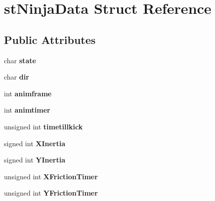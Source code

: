 \hypertarget{structst_ninja_data}{
\section{stNinjaData Struct Reference}
\label{structst_ninja_data}
}
\subsection*{Public Attributes}
\begin{DoxyCompactItemize}
\item 
\hypertarget{structst_ninja_data_ae31a89abf33865e4f36630259c9e4241}{
char {\bfseries state}}
\label{structst_ninja_data_ae31a89abf33865e4f36630259c9e4241}

\item 
\hypertarget{structst_ninja_data_a3927b20726d2ae66c63eb417c055d610}{
char {\bfseries dir}}
\label{structst_ninja_data_a3927b20726d2ae66c63eb417c055d610}

\item 
\hypertarget{structst_ninja_data_a281d133f7ac17cb02a7a3d467bee1457}{
int {\bfseries animframe}}
\label{structst_ninja_data_a281d133f7ac17cb02a7a3d467bee1457}

\item 
\hypertarget{structst_ninja_data_adadd70455904e395251d2c69b8ca97b1}{
int {\bfseries animtimer}}
\label{structst_ninja_data_adadd70455904e395251d2c69b8ca97b1}

\item 
\hypertarget{structst_ninja_data_a71a5f1fe6c3f3f03fcaa0055e52f47b9}{
unsigned int {\bfseries timetillkick}}
\label{structst_ninja_data_a71a5f1fe6c3f3f03fcaa0055e52f47b9}

\item 
\hypertarget{structst_ninja_data_af5ec34e2225c7cd45e80ef5511aeb9da}{
signed int {\bfseries XInertia}}
\label{structst_ninja_data_af5ec34e2225c7cd45e80ef5511aeb9da}

\item 
\hypertarget{structst_ninja_data_ab621c6f12874792714ef13e4fcf4415e}{
signed int {\bfseries YInertia}}
\label{structst_ninja_data_ab621c6f12874792714ef13e4fcf4415e}

\item 
\hypertarget{structst_ninja_data_a6a465e322dc16dddef66d5666987b475}{
unsigned int {\bfseries XFrictionTimer}}
\label{structst_ninja_data_a6a465e322dc16dddef66d5666987b475}

\item 
\hypertarget{structst_ninja_data_ad55a37ea8f419522c3581f96e9cf0f88}{
unsigned int {\bfseries YFrictionTimer}}
\label{structst_ninja_data_ad55a37ea8f419522c3581f96e9cf0f88}


\end{DoxyCompactItemize}
